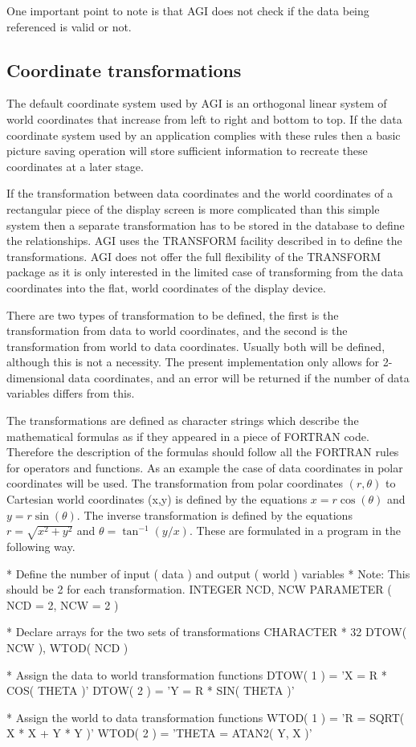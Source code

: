 \documentclass[twoside,11pt,nolof]{starlink}
\begin{document}
One important point to note is that AGI does not check if the data being
referenced is valid or not.

\subsection{Coordinate transformations}\label{tran}
The default coordinate system used by AGI is an orthogonal linear
system of world coordinates that increase from left to right and
bottom to top. If the data coordinate system used by an application
complies with these rules then a basic picture saving operation
will store sufficient information to recreate these coordinates at a
later stage.

If the transformation between data coordinates and the world coordinates
of a rectangular piece of the display screen is more complicated than
this simple system then a separate transformation has to be stored in
the database to define the relationships.
AGI uses the TRANSFORM facility described in 
to define the
transformations. AGI does not offer the full flexibility of the TRANSFORM
package as it is only interested in the limited case of transforming
from the data coordinates into the flat, world coordinates of the display
device.

There are two types of transformation to be defined, the first is the
transformation from data to world coordinates, and the second is the
transformation from world to data coordinates. Usually both will be
defined, although this is not a necessity.
The present implementation only allows for 2-dimensional data
coordinates, and an error will be returned if the number of data
variables differs from this.

The transformations are defined as character strings which describe the
mathematical formulas as if they appeared in a piece of FORTRAN code.
Therefore the description of the formulas should follow all the FORTRAN
rules for operators and functions. As an example the case of data
coordinates in polar coordinates will be used. The transformation
from polar coordinates $(r,\theta)$ to Cartesian world coordinates (x,y)
is defined by the equations
$x = r \cos( \theta )$ and $y = r \sin( \theta )$.
The inverse transformation is defined by the equations
$r = \sqrt{x^2+y^2}$ and $\theta = \tan^{-1}(y/x)$.
These are formulated in a program in the following way.
\begin{terminalv}
    *   Define the number of input ( data ) and output ( world ) variables
    *   Note: This should be 2 for each transformation.
          INTEGER NCD, NCW
          PARAMETER ( NCD = 2, NCW = 2 )

    *   Declare arrays for the two sets of transformations
          CHARACTER * 32 DTOW( NCW ), WTOD( NCD )

    *   Assign the data to world transformation functions
          DTOW( 1 ) = 'X = R * COS( THETA )'
          DTOW( 2 ) = 'Y = R * SIN( THETA )'

    *   Assign the world to data transformation functions
          WTOD( 1 ) = 'R = SQRT( X * X + Y * Y )'
          WTOD( 2 ) = 'THETA = ATAN2( Y, X )'
\end{terminalv}
\end{document}
